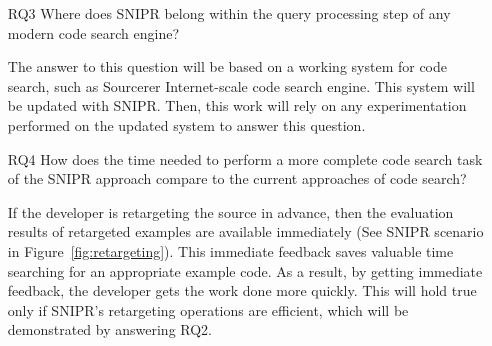 \begin{itemize}
	\item[RQ3] Where does \uppercase{SnipR} belong within the query processing step of any 
	modern code search engine?
	
	The answer to this question will be based on a working system for code search, such as 
	Sourcerer\cite{Bajracharya:2006vn} Internet-scale code search engine. This system will 
	be updated with \uppercase{SnipR}. Then, this work will rely on any experimentation performed 
	on the updated system to answer this question. 
	
	
	\item[RQ4] How does the time needed to perform a more complete code search task of the 
	\uppercase{SnipR} approach compare to the current approaches of code search? 
	
	If the developer is retargeting the source in advance, then the evaluation results of 
	retargeted examples are available immediately (See \uppercase{SnipR} scenario in 
	Figure~\ref{fig:retargeting}). This immediate feedback saves valuable time searching for an 
	appropriate example code. As a result, by getting immediate feedback, the developer gets the 
	work done more quickly. This will hold true only if \uppercase{SnipR}'s retargeting operations 
	are efficient, which will be demonstrated by answering RQ2.
	
		

\end{itemize}
